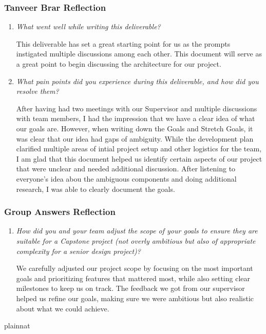 \documentclass{article}
\begin{document}
\subsubsection*{Tanveer Brar Reflection}
\begin{enumerate}
  \item \textit{What went well while writing this deliverable?}

    This deliverable has set a great starting point for us as the
    prompts instigated multiple discussions among each other. This
    document will serve as a great point to begin discussing the
    architecture for our project.

  \item \textit{What pain points did you experience during this
    deliverable, and how did you resolve them?}

    After having had two meetings with our Supervisor and multiple
    discussions with team members, I had the impression that we have
    a clear idea of what our goals are. However, when writing down
    the Goals and Stretch Goals, it was clear that our idea had gaps
    of ambiguity. While the development plan clarified multiple areas
    of intial project setup and other logistics for the team, I am
    glad that this document helped us identify certain aspects of our
    project that were unclear and needed additional discussion. After
    listening to everyone's idea abou the ambiguous components and
    doing additional research, I was able to clearly document the goals.

\end{enumerate}

\subsubsection*{Group Answers Reflection}
\begin{enumerate}
  \item \textit{How did you and your team adjust the scope of your
      goals to ensure they are suitable for a Capstone project (not overly
    ambitious but also of appropriate complexity for a senior design project)?}

    We carefully adjusted our project scope by focusing on the most
    important goals and prioritizing features that mattered most, while also
    setting clear milestones to keep us on track. The feedback we got
    from our supervisor helped us refine our goals, making sure we
    were ambitious but
    also realistic about what we could achieve.

\end{enumerate}

 {plainnat}

\end{document}
